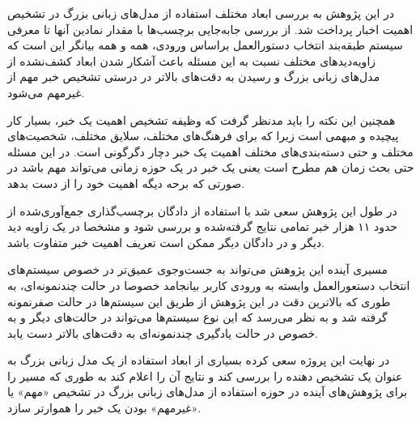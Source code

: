 در این پژوهش به بررسی ابعاد مختلف استفاده از مدل‌های زبانی بزرگ در تشخیص اهمیت اخبار پرداخت شد. از بررسی جابه‌جایی برچسب‌ها با مقدار نمادین آنها تا معرفی سیستم طبقه‌بند انتخاب دستورالعمل براساس ورودی، همه و همه بیانگر این است که زاویه‌دید‌های مختلف نسبت به این مسئله باعث آشکار شدن ابعاد کشف‌نشده از مدل‌های زبانی بزرگ و رسیدن به دقت‌های بالاتر در درستی تشخیص خبر مهم از غیرمهم می‌شود.

همچنین این نکته را باید مدنظر گرفت که وظیفه تشخیص اهمیت یک خبر، بسیار کار پیچیده و مبهمی است زیرا که برای فرهنگ‌های مختلف، سلایق مختلف، شخصیت‌های مختلف و حتی دسته‌بندی‌های مختلف اهمیت یک خبر دچار دگرگونی است. در این مسئله حتی بحث زمان هم مطرح است یعنی یک خبر در یک حوزه زمانی می‌تواند مهم باشد در صورتی که برحه دیگه اهمیت خود را از دست بدهد.

در طول این پژوهش سعی شد با استفاده از دادگان برچسب‌گذاری جمع‌آوری‌شده از حدود ۱۱ هزار خبر تمامی نتایج گرفته‌شده و بررسی شود و مشخصا در یک زاویه دید دیگر و در دادگان دیگر ممکن است تعریف اهمیت خبر متفاوت باشد.

مسیری آینده این پژوهش می‌تواند به جست‌وجوی عمیق‌تر در خصوص سیستم‌های انتخاب دستعورالعمل‌ وابسته به ورودی کاربر بیانجامد خصوصا در حالت چندنمونه‌ای، به طوری که بالاترین دقت در این پژوهش از طریق این سیستم‌ها در حالت صفر‌نمونه گرفته شد و به نظر می‌رسد که این نوع سیستم‌ها می‌تواند در حالت‌های دیگر و به خصوص در حالت یادگیری چندنمونه‌ای به دقت‌های بالاتر دست یابد.

در نهایت این پروژه سعی کرده بسیاری از ابعاد استفاده از یک مدل زبانی بزرگ به عنوان یک تشخیص دهنده را بررسی کند و نتایج آن را اعلام کند به طوری که مسیر را برای پژوهش‌های آینده در حوزه استفاده از مدل‌های زبانی بزرگ در تشخیص «مهم» یا «غیرمهم» بودن یک خبر را هموارتر سازد.